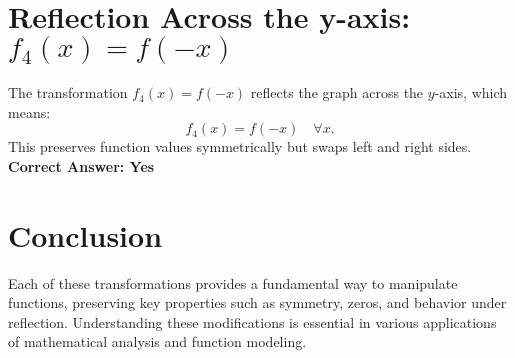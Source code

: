 \documentclass{article}
\begin{document}
\section{Reflection Across the y-axis: $f_4(x) = f(-x)$}
The transformation $f_4(x) = f(-x)$ reflects the graph across the $y$-axis, which means:
\[
f_4(x) = f(-x) \quad \forall x.
\]
This preserves function values symmetrically but swaps left and right sides.\newline
\textbf{Correct Answer: Yes}

\section{Conclusion}
Each of these transformations provides a fundamental way to manipulate functions, preserving key properties such as symmetry, zeros, and behavior under reflection. Understanding these modifications is essential in various applications of mathematical analysis and function modeling.
\end{document}
